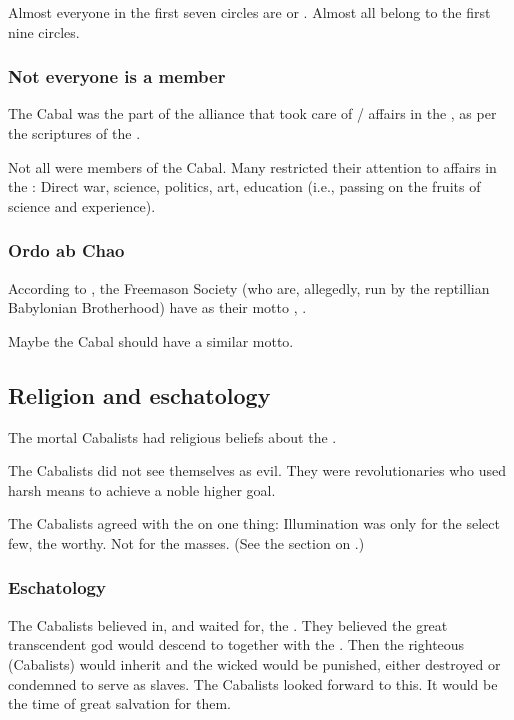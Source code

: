 Almost everyone in the first seven circles are \resphain{} or \banes. Almost all \resphain{} belong to the first nine circles. 





\subsubsection{Not everyone is a member}
The Cabal was the part of the \resphain{} alliance that took care of \bane/\resphan{} affairs in the , as per the scriptures of the . 

Not all \resphain{} were members of the Cabal. 
Many restricted their attention to affairs in the : 
Direct war, science, politics, art, education (i.e., passing on the fruits of science and experience). 





\subsubsection{Ordo ab Chao}
According to \DIBiggestSecret, the Freemason Society (who are, allegedly, run by the reptillian Babylonian Brotherhood) have as their motto , .

Maybe the Cabal should have a similar motto. 









\subsection{Religion and eschatology}
The mortal Cabalists had religious beliefs about the \resphain. 

The Cabalists did not see themselves as evil.
They were revolutionaries who used harsh means to achieve a noble higher goal. 

The Cabalists agreed with the \rethyaxes on one thing: 
Illumination was only for the select few, the worthy. 
Not for the masses. 
(See the section on .)





\subsubsection{Eschatology}
The Cabalists believed in, and waited for, the . 
They believed the great transcendent god \Lithrim would descend to \Miith together with the \resphain.
Then the righteous (Cabalists) would inherit \Miith and the wicked would be punished, either destroyed or condemned to serve as slaves. 
The Cabalists looked forward to this.
It would be the time of great salvation for them. 

